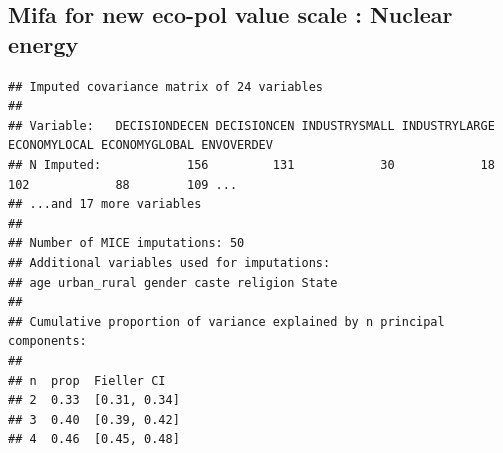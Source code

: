 \documentclass[
]{article}
\begin{document}
\hypertarget{mifa-for-new-eco-pol-value-scale-nuclear-energy}{%
\subsection{Mifa for new eco-pol value scale : Nuclear
energy}\label{mifa-for-new-eco-pol-value-scale-nuclear-energy}}

\begin{verbatim}
## Imputed covariance matrix of 24 variables
## 
## Variable:   DECISIONDECEN DECISIONCEN INDUSTRYSMALL INDUSTRYLARGE ECONOMYLOCAL ECONOMYGLOBAL ENVOVERDEV 
## N Imputed:            156         131            30            18          102            88        109 ...
## ...and 17 more variables
## 
## Number of MICE imputations: 50
## Additional variables used for imputations:
## age urban_rural gender caste religion State
## 
## Cumulative proportion of variance explained by n principal components:
## 
## n  prop  Fieller CI    
## 2  0.33  [0.31, 0.34]  
## 3  0.40  [0.39, 0.42]  
## 4  0.46  [0.45, 0.48]
\end{verbatim}
\end{document}
